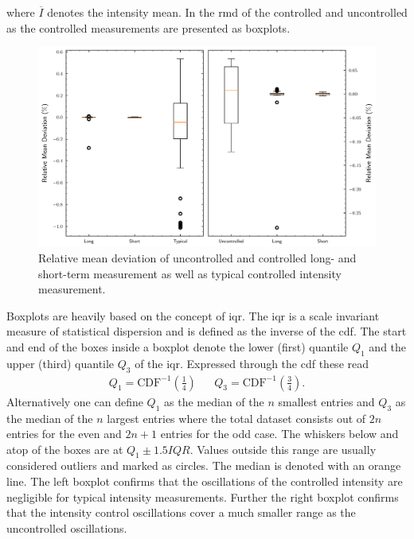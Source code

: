 where $\overline{I}$ denotes the intensity mean. In
 the \gls{rmd} of the controlled and
uncontrolled as the controlled measurements are presented as boxplots.
\begin{figure}[htb]
  \centering
  \includegraphics[width=\textwidth]
{../figure/intensity/control/relative-mean-deviation.pdf}
  \caption{Relative mean deviation of uncontrolled and controlled long- and
    short-term measurement as well as typical controlled intensity measurement.
  }\label{fig:intensity_control_rmd}
\end{figure}
Boxplots are heavily based on the concept of \gls{iqr}. The \gls{iqr} is a
scale invariant measure of statistical dispersion and is defined as the
inverse of the \gls{cdf}. The start and end of the boxes inside a boxplot
denote the lower (first) quantile $Q_1$ and the upper (third) quantile $Q_3$
of the \gls{iqr}. Expressed through the \gls{cdf} these read
\begin{align}
  Q_1=\text{CDF}^{-1}{\left(\frac{1}{4}\right)} &&
  Q_3=\text{CDF}^{-1}{\left(\frac{3}{4}\right)}.
\end{align}
Alternatively one can define $Q_1$ as the median of the $n$ smallest entries
and $Q_3$ as the median of the $n$ largest entries where the total dataset
consists out of $2n$ entries for the even and $2n+1$ entries for the odd case.
The whiskers below and atop of the boxes are at $Q_1\pm1.5IQR$. Values outside
this range are usually considered outliers and marked as circles. The median
is denoted with an orange line. The left boxplot confirms that the
oscillations of the controlled intensity are negligible for typical intensity
measurements. Further the right boxplot confirms that the intensity control
oscillations cover a much smaller range as the uncontrolled oscillations.

